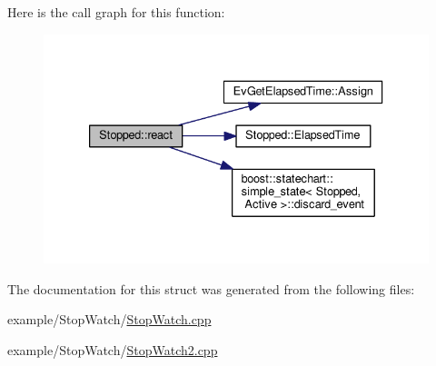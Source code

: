 Here is the call graph for this function\+:
\nopagebreak
\begin{figure}[H]
\begin{center}
\leavevmode
\includegraphics[width=333pt]{struct_stopped_a47513114d162de9fc052be34a3b84dc3_cgraph}
\end{center}
\end{figure}


The documentation for this struct was generated from the following files\+:\begin{DoxyCompactItemize}
\item 
example/\+Stop\+Watch/\mbox{\hyperlink{_stop_watch_8cpp}{Stop\+Watch.\+cpp}}\item 
example/\+Stop\+Watch/\mbox{\hyperlink{_stop_watch2_8cpp}{Stop\+Watch2.\+cpp}}\end{DoxyCompactItemize}
